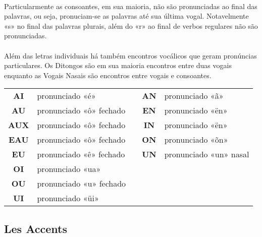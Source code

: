 \documentclass{article}
\begin{document}
        \paragraph{}Particularmente as consoantes, em sua maioria, não são pronunciadas ao final das palavras, ou seja, pronuciam-se as palavras até sua última vogal. Notavelmente «s» no final das palavras plurais, além do «r» ao final de verbos regulares não são pronunciadas.
        
        \paragraph{}Além das letras individuais há também encontros vocálicos que geram pronúncias particulares. Os Ditongos são em sua maioria encontros entre duas vogais enquanto as Vogais Nasais são encontros entre vogais e consoantes.
        
            \begin{center}
                \begin{tabular}{c  l  c  c  l}
                    \textbf{AI}  & pronunciado «é»         &  & \textbf{AN} & pronunciado «ã»\\
                    \textbf{AU}  & pronunciado «ô» fechado &  & \textbf{EN} & pronunciado «ën»\\
                    \textbf{AUX} & pronunciado «ô» fechado &  & \textbf{IN} & pronunciado «ën»\\
                    \textbf{EAU} & pronunciado «ô» fechado &  & \textbf{ON} & pronunciado «õn»\\
                    \textbf{EU}  & pronunciado «ê» fechado &  & \textbf{UN} & pronunciado «un» nasal\\
                    \textbf{OI}  & pronunciado «ua»        &  &  & \\
                    \textbf{OU}  & pronunciado «u» fechado &  &  & \\
                    \textbf{UI}  & pronunciado «üi»        &  &  & \\
                \end{tabular}               
            \end{center}  
            
    \subsection{Les Accents}
\end{document}
